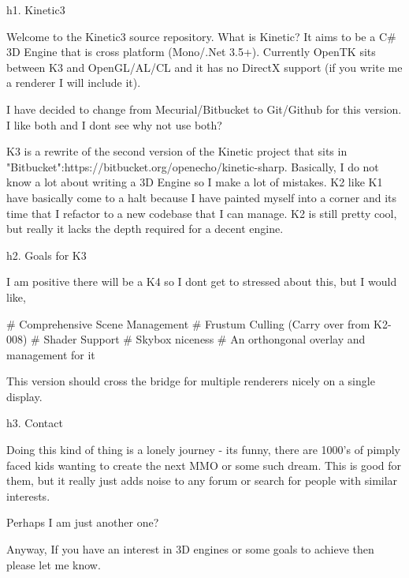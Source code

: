 h1. Kinetic3

Welcome to the Kinetic3 source repository. What is Kinetic? It aims to be a C# 3D Engine that is cross platform (Mono/.Net 3.5+). Currently OpenTK sits between K3 and OpenGL/AL/CL and it has no DirectX support (if you write me a renderer I will include it).

I have decided to change from Mecurial/Bitbucket to Git/Github for this version. I like both and I dont see why not use both?

K3 is a rewrite of the second version of the Kinetic project that sits in "Bitbucket":https://bitbucket.org/openecho/kinetic-sharp. Basically, I do not know a lot about writing a 3D Engine so I make a lot of mistakes. K2 like K1 have basically come to a halt because I have painted myself into a corner and its time that I refactor to a new codebase that I can manage. K2 is still pretty cool, but really it lacks the depth required for a decent engine.

h2. Goals for K3

I am positive there will be a K4 so I dont get to stressed about this, but I would like,

# Comprehensive Scene Management
# Frustum Culling (Carry over from K2-008)
# Shader Support
# Skybox niceness
# An orthongonal overlay and management for it

This version should cross the bridge for multiple renderers nicely on a single display.

h3. Contact

Doing this kind of thing is a lonely journey - its funny, there are 1000's of pimply faced kids wanting to create the next MMO or some such dream. This is good for them, but it really just adds noise to any forum or search for people with similar interests. 

Perhaps I am just another one?

Anyway, If you have an interest in 3D engines or some goals to achieve then please let me know. 
